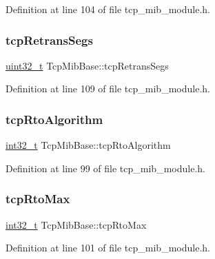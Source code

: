 Definition at line 104 of file tcp\+\_\+mib\+\_\+module.\+h.

\mbox{\label{structTcpMibBase_a1d65ad5ffcd9d4b6817edb95ad965427}} 
\subsubsection{\texorpdfstring{tcp\+Retrans\+Segs}{tcpRetransSegs}}
{\footnotesize\ttfamily \hyperlink{stdint_8h_a435d1572bf3f880d55459d9805097f62}{uint32\+\_\+t} Tcp\+Mib\+Base\+::tcp\+Retrans\+Segs}



Definition at line 109 of file tcp\+\_\+mib\+\_\+module.\+h.

\mbox{\label{structTcpMibBase_a071bca65cede81d7e95dd6aa1d389d33}} 
\subsubsection{\texorpdfstring{tcp\+Rto\+Algorithm}{tcpRtoAlgorithm}}
{\footnotesize\ttfamily \hyperlink{stdint_8h_ab1967d8591af1a4e48c37fd2b0f184d0}{int32\+\_\+t} Tcp\+Mib\+Base\+::tcp\+Rto\+Algorithm}



Definition at line 99 of file tcp\+\_\+mib\+\_\+module.\+h.

\mbox{\label{structTcpMibBase_a275ff3ea426d35f2a47ec1d03b62ff35}} 
\subsubsection{\texorpdfstring{tcp\+Rto\+Max}{tcpRtoMax}}
{\footnotesize\ttfamily \hyperlink{stdint_8h_ab1967d8591af1a4e48c37fd2b0f184d0}{int32\+\_\+t} Tcp\+Mib\+Base\+::tcp\+Rto\+Max}



Definition at line 101 of file tcp\+\_\+mib\+\_\+module.\+h.

\mbox{\label{structTcpMibBase_a96d086f1316ea9a782b6c919962203f6}} 
